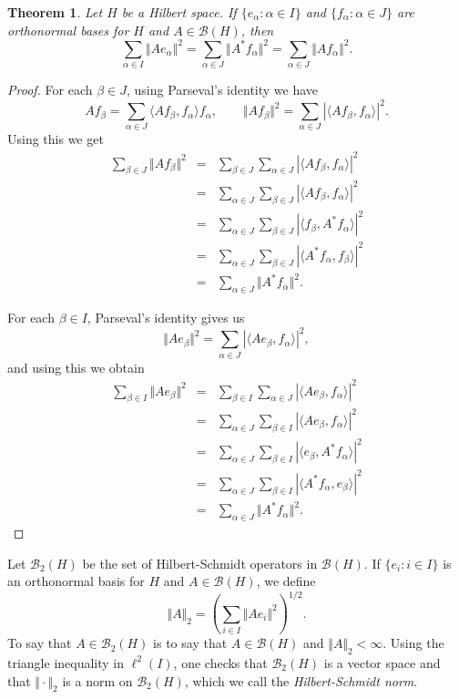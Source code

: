 \documentclass{article}
\newcommand{\inner}[2]{\langle #1, #2 \rangle}
\newcommand{\norm}[1]{\Vert #1 \Vert}
\newtheorem{theorem}{Theorem}
\begin{document}
\begin{theorem}
Let $H$ be a  Hilbert space. If $\{e_\alpha: \alpha \in I\}$ and $\{f_\alpha: \alpha \in J\}$ are orthonormal bases for $H$ and $A \in \mathscr{B}(H)$, then
\[
 \sum_{\alpha \in I} \norm{Ae_\alpha}^2 = \sum_{\alpha \in J} \norm{A^*f_\alpha}^2= \sum_{\alpha \in J} \norm{Af_\alpha}^2.
 \]
 \label{basisindependent}
\end{theorem}
\begin{proof}
For each $\beta \in J$, using Parseval's identity we have
\[
Af_\beta = \sum_{\alpha \in J} \inner{Af_\beta}{f_\alpha}f_\alpha, \qquad \norm{Af_\beta}^2=\sum_{\alpha \in J} |\inner{Af_\beta}{f_\alpha}|^2.
\]
Using this we get 
\begin{eqnarray*}
\sum_{\beta \in J} \norm{Af_\beta}^2&=&\sum_{\beta \in J} \sum_{\alpha \in J} |\inner{Af_\beta}{f_\alpha}|^2\\
&=&\sum_{\alpha \in J} \sum_{\beta \in J} |\inner{Af_\beta}{f_\alpha}|^2\\
&=&\sum_{\alpha \in J} \sum_{\beta \in J} |\inner{f_\beta}{A^*f_\alpha}|^2\\
&=&\sum_{\alpha \in J} \sum_{\beta \in J} |\inner{A^*f_\alpha}{f_\beta}|^2\\
&=&\sum_{\alpha \in J} \norm{A^* f_\alpha}^2.
\end{eqnarray*}

For each $\beta \in I$, Parseval's identity gives us
\[
\norm{Ae_\beta}^2=\sum_{\alpha \in J} |\inner{Ae_\beta}{f_\alpha}|^2,
\]
and using this we obtain
\begin{eqnarray*}
\sum_{\beta \in I} \norm{Ae_\beta}^2&=&\sum_{\beta \in I} \sum_{\alpha \in J} |\inner{Ae_\beta}{f_\alpha}|^2\\
&=&\sum_{\alpha \in J} \sum_{\beta \in I} |\inner{Ae_\beta}{f_\alpha}|^2\\
&=&\sum_{\alpha \in J} \sum_{\beta \in I}|\inner{e_\beta}{A^*f_\alpha}|^2\\
&=&\sum_{\alpha \in J} \sum_{\beta \in I}|\inner{A^*f_\alpha}{e_\beta}|^2\\
&=&\sum_{\alpha \in J} \norm{A^* f_\alpha}^2.
\end{eqnarray*}
\end{proof}


Let $\mathscr{B}_2(H)$ be the set of Hilbert-Schmidt operators in $\mathscr{B}(H)$.
If $\{e_i:i \in I\}$ is an orthonormal basis for $H$ and $A \in \mathscr{B}(H)$, we define
\[
\norm{A}_2 = \left( \sum_{ i \in I} \norm{Ae_i}^2\right)^{1/2}.
\]
To say that $A \in \mathscr{B}_2(H)$ is to say that $A \in \mathscr{B}(H)$ and $\norm{A}_2 < \infty$. 
Using the triangle inequality in $\ell^2(I)$,
one checks that $\mathscr{B}_2(H)$ is a vector space and that $\norm{\cdot}_2$ is a norm on $\mathscr{B}_2(H)$, which we call
the {\em Hilbert-Schmidt norm}.
\end{document}
